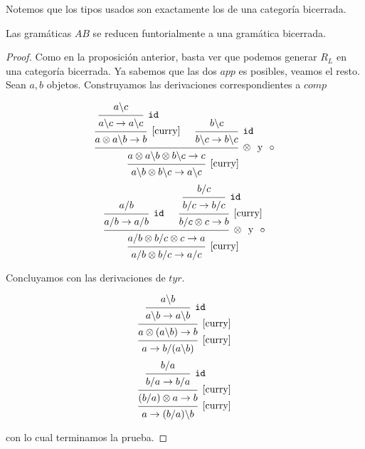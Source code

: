 \documentclass[../main.tex]{subfiles}
\begin{document}
	\begin{ej}
	\end{ej}
	
	Notemos que los tipos usados son exactamente los de una categoría bicerrada.
	
	\begin{prop}
		Las gramáticas $AB$ se reducen funtorialmente a una gramática bicerrada.
	\end{prop} 
	\begin{proof}
		Como en la proposición anterior, basta ver que podemos generar $R_L$ en una categoría bicerrada. Ya sabemos que las dos $app$ es posibles, veamos el resto. Sean $a,b$ objetos. Construyamos las derivaciones correspondientes a $comp$
		\begin{multicols}{2}
			\[
			\begin{prooftree}
				\hypo{a \backslash c}
				\infer1[{\tt{id}}]{a \backslash c \to a \backslash c}
				\infer1[\ref{curry}]{a \otimes a \backslash b \to b}
				\hypo{b \backslash c}
				\infer1[{\tt{id}}]{b \backslash c \to b \backslash c}
				\infer2[$\otimes$ \text{ y } $\circ$]{a \otimes a \backslash b \otimes b \backslash c \to c}
				\infer1[\ref{curry}]{a \backslash b \otimes b \backslash c \to a \backslash c}
			\end{prooftree}
			\]
			\[
			\begin{prooftree}
				\hypo{a/b}
				\infer1[\tt{id}]{a/b \to a/b}
				\hypo{b/c}
				\infer1[\tt{id}]{b/c \to b/c}
				\infer1[\ref{curry}]{b/c \otimes c \to b}
				\infer2[$\otimes$ \text{ y } $\circ$]{a/b \otimes b/c \otimes c \to a}
				\infer1[\ref{curry}]{a/b \otimes b/c \to a/c}
			\end{prooftree}
			\]
		\end{multicols}
		Concluyamos con las derivaciones de $tyr$.
		\begin{multicols}{2}
			\[
			\begin{prooftree}
				\hypo{a \backslash b}
				\infer1[{\tt{id}}]{a \backslash b \to a \backslash b}
				\infer1[\ref{curry}]{a \otimes (a \backslash b) \to b}
				\infer1[\ref{curry}]{a \to b/(a \backslash b)}
			\end{prooftree}
			\]
			\[
			\begin{prooftree}
				\hypo{b/a}
				\infer1[{\tt{id}}]{b/a \to b/a}
				\infer1[\ref{curry}]{(b/a)\otimes a \to b}
				\infer1[\ref{curry}]{a \to (b/a) \backslash b}
			\end{prooftree}
			\]
		\end{multicols} 
		con lo cual terminamos la prueba. 
	\end{proof}
	
\end{document}
